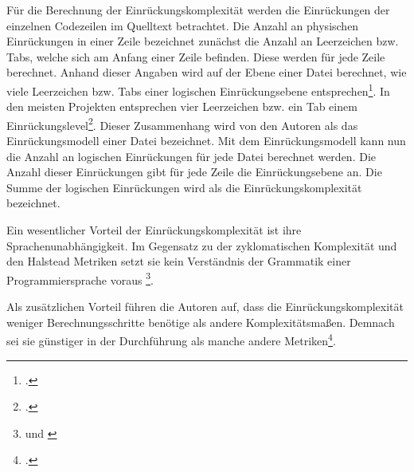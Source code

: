 Für die Berechnung der Einrückungskomplexität werden die Einrückungen
der einzelnen Codezeilen im Quelltext betrachtet. Die Anzahl an
physischen Einrückungen in einer Zeile bezeichnet zunächst die Anzahl an
Leerzeichen bzw. Tabs, welche sich am Anfang einer Zeile befinden. Diese
werden für jede Zeile berechnet. Anhand dieser Angaben wird auf der
Ebene einer Datei berechnet, wie viele Leerzeichen bzw. Tabs einer
logischen Einrückungsebene entsprechen\footcite[Vgl. ][S. 5]{hindleReadingLinesUsing2009}. In den meisten Projekten entsprechen vier Leerzeichen bzw. ein
Tab einem Einrückungslevel\footcite[Vgl. ][S. 9]{hindleReadingLinesUsing2009}.
Dieser Zusammenhang wird von den Autoren als das Einrückungsmodell einer
Datei bezeichnet. Mit dem Einrückungsmodell kann nun die Anzahl an
logischen Einrückungen für jede Datei berechnet werden. Die Anzahl
dieser Einrückungen gibt für jede Zeile die Einrückungsebene an. Die
Summe der logischen Einrückungen wird als die Einrückungskomplexität
bezeichnet.

Ein wesentlicher Vorteil der Einrückungskomplexität ist ihre
Sprachenunabhängigkeit. Im Gegensatz zu der zyklomatischen Komplexität
und den Halstead Metriken setzt sie kein Verständnis der Grammatik einer
Programmiersprache voraus \footnote{\cite[Vgl.][S. 1]{hindleReadingLinesUsing2009} und \cite[S. 2]{hindleReadingLinesUsing2009}}.

Als zusätzlichen Vorteil führen die Autoren auf, dass die
Einrückungskomplexität weniger Berechnungsschritte benötige als andere
Komplexitätsma\ss en. Demnach sei sie günstiger in der Durchführung als
manche andere Metriken\footcite[Vgl. ][S. 20f]{hindleReadingLinesUsing2009}.